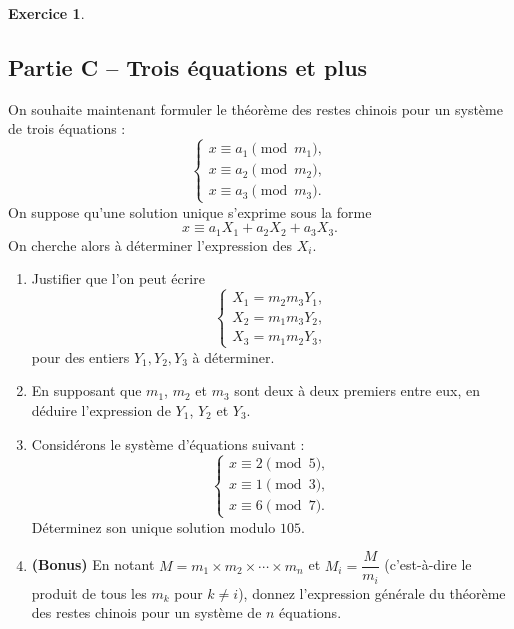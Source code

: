 \documentclass{article}
\theoremstyle{definition}
\newtheorem{exercice}{Exercice}
\begin{document}
\begin{exercice}
  \subsection*{Partie C -- Trois équations et plus}
  On souhaite maintenant formuler le théorème des restes chinois pour un système de trois équations :
  \[
  \begin{cases}
    x \equiv a_1 \pmod{m_1}, \\
    x \equiv a_2 \pmod{m_2}, \\
    x \equiv a_3 \pmod{m_3}.
  \end{cases}
  \]
  On suppose qu'une solution unique s'exprime sous la forme
  \[
  x \equiv a_1 X_1 + a_2 X_2 + a_3 X_3.
  \]
  On cherche alors à déterminer l'expression des \(X_i\).
  \begin{enumerate}
    \item Justifier que l'on peut écrire
    \[
    \begin{cases}
      X_1 = m_2m_3Y_1, \\
      X_2 = m_1m_3Y_2, \\
      X_3 = m_1m_2Y_3,
    \end{cases}
    \]
    pour des entiers \(Y_1, Y_2, Y_3\) à déterminer.
    \item En supposant que \(m_1\), \(m_2\) et \(m_3\) sont deux à deux premiers entre eux, en déduire l'expression de \(Y_1\), \(Y_2\) et \(Y_3\).
    \item Considérons le système d'équations suivant :
    \[
    \begin{cases}
    x \equiv 2 \pmod{5}, \\
    x \equiv 1 \pmod{3}, \\
    x \equiv 6 \pmod{7}.
    \end{cases}
    \]
    Déterminez son unique solution modulo \(105\).
    \item \textbf{(Bonus)} En notant \(M = m_1 \times m_2 \times \cdots \times m_n\) et \(M_i = \dfrac{M}{m_i}\) (c'est-à-dire le produit de tous les \(m_k\) pour \(k \neq i\)), donnez l'expression générale du théorème des restes chinois pour un système de \(n\) équations.
  \end{enumerate}
  
\end{exercice}
\end{document}

